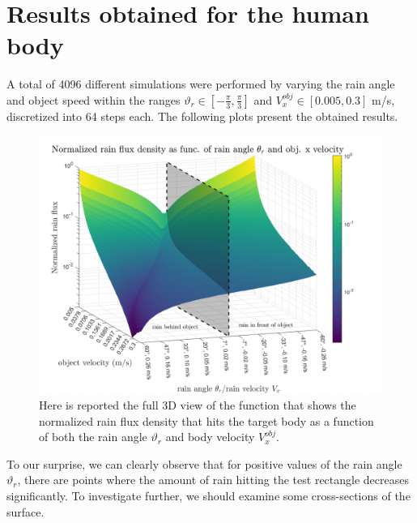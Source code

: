 \documentclass[12pt]{report}
\begin{document}
        \section{Results obtained for the human body}
            A total of 4096 different simulations were performed by varying the rain angle and object speed within the ranges $\vartheta_r \in [-\frac{\pi}{3}, \frac{\pi}{3}]$ and $V^{obj}_x \in [0.005, 0.3]$ m/s, discretized into 64 steps each. The following plots present the obtained results.
            \begin{figure}[H]
                \centering
                \includegraphics[width=1\textwidth]{images/human/rain_flux_surf_3D.pdf}
                \caption{Here is reported the full 3D view of the function that shows the normalized rain flux density that hits the target body as a function of both the rain angle $\vartheta_r$ and body velocity $V^{obj}_x$.}
            \end{figure}
            \vspace{-30pt}
            To our surprise, we can clearly observe that for positive values of the rain angle $\vartheta_r$, there are points where the amount of rain hitting the test rectangle decreases significantly. To investigate further, we should examine some cross-sections of the surface.
\end{document}
